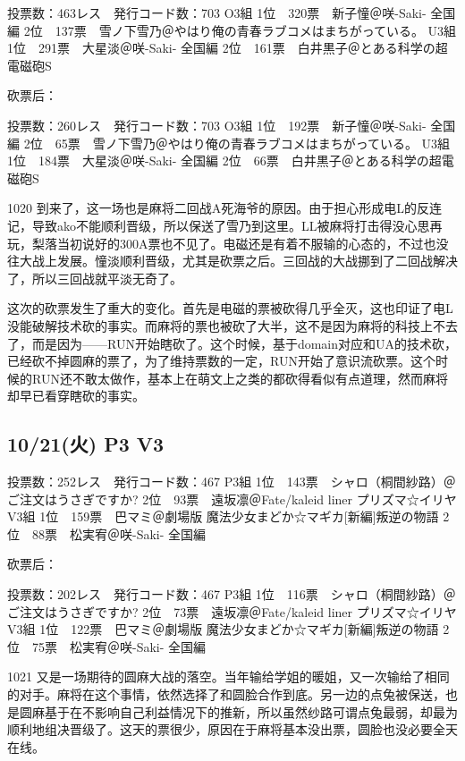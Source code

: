     投票数：463レス　発行コード数：703
    O3組
    1位　320票　新子憧＠咲-Saki- 全国編
    2位　137票　雪ノ下雪乃＠やはり俺の青春ラブコメはまちがっている。
    U3組
    1位　291票　大星淡＠咲-Saki- 全国編
    2位　161票　白井黒子＠とある科学の超電磁砲S

砍票后：

    投票数：260レス　発行コード数：703
    O3組
    1位　192票　新子憧＠咲-Saki- 全国編
    2位　65票　雪ノ下雪乃＠やはり俺の青春ラブコメはまちがっている。
    U3組
    1位　184票　大星淡＠咲-Saki- 全国編
    2位　66票　白井黒子＠とある科学の超電磁砲S

1020 到来了，这一场也是麻将二回战A死海爷的原因。由于担心形成电L的反连记，导致ako不能顺利晋级，所以保送了雪乃到这里。LL被麻将打击得没心思再玩，梨落当初说好的300A票也不见了。电磁还是有着不服输的心态的，不过也没往大战上发展。憧淡顺利晋级，尤其是砍票之后。三回战的大战挪到了二回战解决了，所以三回战就平淡无奇了。

这次的砍票发生了重大的变化。首先是电磁的票被砍得几乎全灭，这也印证了电L没能破解技术砍的事实。而麻将的票也被砍了大半，这不是因为麻将的科技上不去了，而是因为——RUN开始瞎砍了。这个时候，基于domain对应和UA的技术砍，已经砍不掉圆麻的票了，为了维持票数的一定，RUN开始了意识流砍票。这个时候的RUN还不敢太做作，基本上在萌文上之类的都砍得看似有点道理，然而麻将却早已看穿瞎砍的事实。

\subsection{10/21(火) P3 V3}

    投票数：252レス　発行コード数：467
    P3組
    1位　143票　シャロ（桐間紗路）＠ご注文はうさぎですか?
    2位　93票　遠坂凛＠Fate/kaleid liner プリズマ☆イリヤ
    V3組
    1位　159票　巴マミ＠劇場版 魔法少女まどか☆マギカ[新編]叛逆の物語
    2位　88票　松実宥＠咲-Saki- 全国編

砍票后：

    投票数：202レス　発行コード数：467
    P3組
    1位　116票　シャロ（桐間紗路）＠ご注文はうさぎですか?
    2位　73票　遠坂凛＠Fate/kaleid liner プリズマ☆イリヤ
    V3組
    1位　122票　巴マミ＠劇場版 魔法少女まどか☆マギカ[新編]叛逆の物語
    2位　75票　松実宥＠咲-Saki- 全国編

1021 又是一场期待的圆麻大战的落空。当年输给学姐的暖姐，又一次输给了相同的对手。麻将在这个事情，依然选择了和圆脸合作到底。另一边的点兔被保送，也是圆麻基于在不影响自己利益情况下的推新，所以虽然纱路可谓点兔最弱，却最为顺利地组决晋级了。这天的票很少，原因在于麻将基本没出票，圆脸也没必要全天在线。

